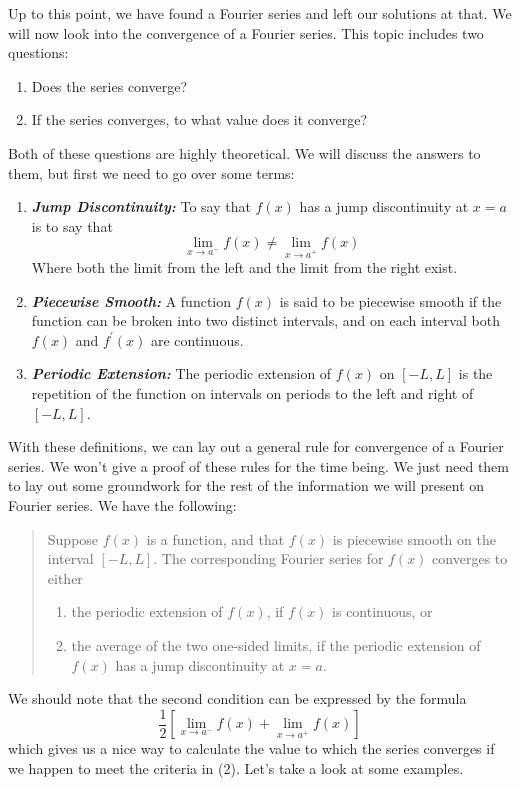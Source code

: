 \documentclass{article}
\begin{document}
\indent Up to this point, we have found a Fourier series and left our solutions at that. We will now look into the convergence of a Fourier series. This topic includes two questions:
\begin{enumerate}
\item Does the series converge?
\item If the series converges, to what value does it converge?
\end{enumerate}
\noindent Both of these questions are highly theoretical. We will discuss the answers to them, but first we need to go over some terms:
\begin{enumerate}
\item \textit{\textbf{Jump Discontinuity:}} To say that $f(x)$ has a jump discontinuity at $x = a$ is to say that
\[
\lim_{x \to a^{-}}f(x) \neq \lim_{x \to a^{+}}f(x)
\]
Where both the limit from the left and the limit from the right exist.
\item \textit{\textbf{Piecewise Smooth:}} A function $f(x)$ is said to be piecewise smooth if the function can be broken into two distinct intervals, and on each interval both $f(x)$ and $f^{'}(x)$ are continuous.
\item \textit{\textbf{Periodic Extension:}} The periodic extension of $f(x)$ on $[-L,L]$ is the repetition of the function on intervals on periods to the left and right of $[-L,L]$.
\end{enumerate}
\indent With these definitions, we can lay out a general rule for convergence of a Fourier series. We won't give a proof of these rules for the time being. We just need them to lay out some groundwork for the rest of the information we will present on Fourier series. We have the following:
\begin{quote}
Suppose $f(x)$ is a function, and that $f(x)$ is piecewise smooth on the interval $[-L,L]$. The corresponding Fourier series for $f(x)$ converges to either
\begin{enumerate}
\item the periodic extension of $f(x)$, if $f(x)$ is continuous, or
\item the average of the two one-sided limits, if the periodic extension of $f(x)$ has a jump discontinuity at $x = a$.
\end{enumerate}
\end{quote}
\noindent We should note that the second condition can be expressed by the formula
\[\frac{1}{2}\left[\lim_{x \to a^{-}}f(x) + \lim_{x \to a^{+}}f(x)\right]\]
which gives us a nice way to calculate the value to which the series converges if we happen to meet the criteria in (2). Let's take a look at some examples.\\\\
\end{document}
